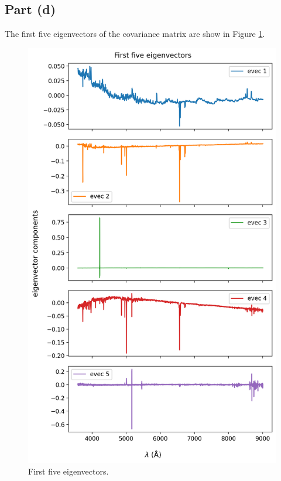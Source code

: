 \documentclass[11pt]{article}
\begin{document}
\subsection{Part (d)}
The first five eigenvectors of the covariance matrix are show in Figure \ref{fig:5evec}.
\begin{figure}[H]
    \centering
    \includegraphics[scale = 0.65]{images/ps6-1d2.png}
    \caption{First five eigenvectors.}
    \label{fig:5evec}
\end{figure}
\end{document}
